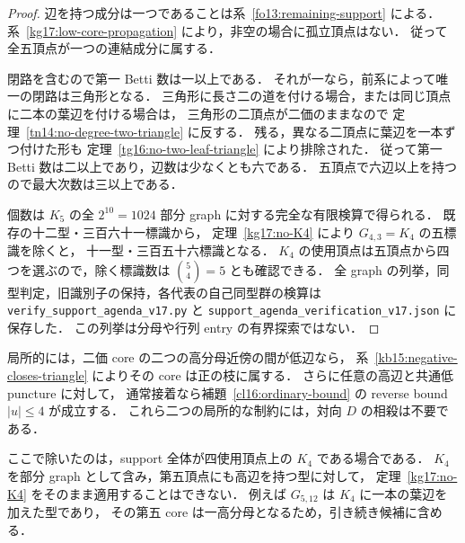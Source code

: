 \begin{proof}
辺を持つ成分は一つであることは系~\ref{fo13:remaining-support} による．
系~\ref{kg17:low-core-propagation} により，非空の場合に孤立頂点はない．
従って全五頂点が一つの連結成分に属する．

閉路を含むので第一 Betti 数は一以上である．
それが一なら，前系によって唯一の閉路は三角形となる．
三角形に長さ二の道を付ける場合，または同じ頂点に二本の葉辺を付ける場合は，
三角形の二頂点が二価のままなので
定理~\ref{tn14:no-degree-two-triangle} に反する．
残る，異なる二頂点に葉辺を一本ずつ付けた形も
定理~\ref{tg16:no-two-leaf-triangle} により排除された．
従って第一 Betti 数は二以上であり，辺数は少なくとも六である．
五頂点で六辺以上を持つので最大次数は三以上である．

個数は $K_5$ の全 $2^{10}=1024$ 部分 graph に対する完全な有限検算で得られる．
既存の十二型・三百六十一標識から，
定理~\ref{kg17:no-K4} により $G_{4,3}=K_4$ の五標識を除くと，
十一型・三百五十六標識となる．
$K_4$ の使用頂点は五頂点から四つを選ぶので，除く標識数は $\binom54=5$ とも確認できる．
全 graph の列挙，同型判定，旧識別子の保持，各代表の自己同型群の検算は
\nolinkurl{verify_support_agenda_v17.py} と
\nolinkurl{support_agenda_verification_v17.json} に保存した．
この列挙は分母や行列 entry の有界探索ではない．
\end{proof}

局所的には，二価 core の二つの高分母近傍の間が低辺なら，
系~\ref{kb15:negative-closes-triangle} によりその core は正の枝に属する．
さらに任意の高辺と共通低 puncture に対して，
通常接着なら補題~\ref{cl16:ordinary-bound} の reverse bound $|u|\le4$ が成立する．
これら二つの局所的な制約には，対向 $D$ の相殺は不要である．

ここで除いたのは，support 全体が四使用頂点上の $K_4$ である場合である．
$K_4$ を部分 graph として含み，第五頂点にも高辺を持つ型に対して，
定理~\ref{kg17:no-K4} をそのまま適用することはできない．
例えば $G_{5,12}$ は $K_4$ に一本の葉辺を加えた型であり，
その第五 core は一高分母となるため，引き続き候補に含める．
